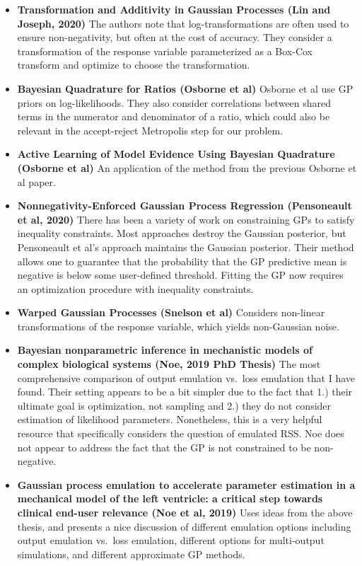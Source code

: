 \documentclass[
]{article}
\providecommand{\tightlist}{%
  \setlength{\itemsep}{0pt}\setlength{\parskip}{0pt}}
\begin{document}
\begin{itemize}
\tightlist
\item
  \textbf{Transformation and Additivity in Gaussian Processes (Lin and
  Joseph, 2020)} The authors note that log-transformations are often
  used to ensure non-negativity, but often at the cost of accuracy. They
  consider a transformation of the response variable parameterized as a
  Box-Cox transform and optimize to choose the transformation.
\item
  \textbf{Bayesian Quadrature for Ratios (Osborne et al)} Osborne et al
  use GP priors on log-likelihoods. They also consider correlations
  between shared terms in the numerator and denominator of a ratio,
  which could also be relevant in the accept-reject Metropolis step for
  our problem.\\
\item
  \textbf{Active Learning of Model Evidence Using Bayesian Quadrature
  (Osborne et al)} An application of the method from the previous
  Osborne et al paper.
\item
  \textbf{Nonnegativity-Enforced Gaussian Process Regression
  (Pensoneault et al, 2020)} There has been a variety of work on
  constraining GPs to satisfy inequality constraints. Most approaches
  destroy the Gaussian posterior, but Pensoneault et al's approach
  maintains the Gaussian posterior. Their method allows one to guarantee
  that the probability that the GP predictive mean is negative is below
  some user-defined threshold. Fitting the GP now requires an
  optimization procedure with inequality constraints.
\item
  \textbf{Warped Gaussian Processes (Snelson et al)} Considers
  non-linear transformations of the response variable, which yields
  non-Gaussian noise.
\item
  \textbf{Bayesian nonparametric inference in mechanistic models of
  complex biological systems (Noe, 2019 PhD Thesis)} The most
  comprehensive comparison of output emulation vs.~loss emulation that I
  have found. Their setting appears to be a bit simpler due to the fact
  that 1.) their ultimate goal is optimization, not sampling and 2.)
  they do not consider estimation of likelihood parameters. Nonetheless,
  this is a very helpful resource that specifically considers the
  question of emulated RSS. Noe does not appear to address the fact that
  the GP is not constrained to be non-negative.
\item
  \textbf{Gaussian process emulation to accelerate parameter estimation
  in a mechanical model of the left ventricle: a critical step towards
  clinical end-user relevance (Noe et al, 2019)} Uses ideas from the
  above thesis, and presents a nice discussion of different emulation
  options including output emulation vs.~loss emulation, different
  options for multi-output simulations, and different approximate GP
  methods.
\end{itemize}
\end{document}
